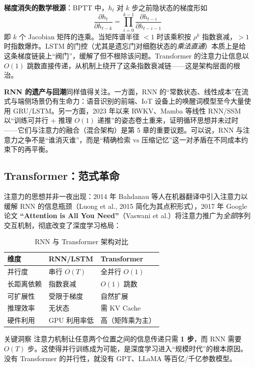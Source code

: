 \documentclass[12pt,a4paper]{article}
\begin{document}
\textbf{梯度消失的数学根源}：BPTT 中，$h_t$ 对 $k$ 步之前隐状态的梯度形如
\[
\frac{\partial h_t}{\partial h_{t-k}} = \prod_{i=0}^{k-1} \frac{\partial h_{t-i}}{\partial h_{t-i-1}}
\]
即 $k$ 个 Jacobian 矩阵的连乘。当矩阵谱半径 $<1$ 时该乘积按 $\rho^k$ 指数衰减，$>1$ 时指数爆炸。LSTM 的门控（尤其是遗忘门对细胞状态的\emph{乘法直通}）本质上是给这条梯度链装上“阀门”，缓解了但不根除该问题。Transformer 的注意力让信息以 $O(1)$ 跳数直接传递，从机制上绕开了这条指数衰减链——这是架构层面的根治。

\textbf{RNN 的遗产与回潮}同样值得关注。一方面，RNN 的“常数状态、线性成本”在流式与端侧场景仍有生命力：语音识别的前端、IoT 设备上的唤醒词模型至今大量使用 GRU/LSTM。另一方面，2023 年以来 RWKV、Mamba 等线性 RNN/SSM 以“训练可并行 + 推理 $O(1)$ 递推”的姿态卷土重来，证明循环思想并未过时——它们与注意力的融合（混合架构）是第 5 章的重要议题。可以说，RNN 与注意力之争不是“谁消灭谁”，而是“精确检索 vs 压缩记忆”这一对矛盾在不同成本约束下的再平衡。

\subsection{Transformer：范式革命}
注意力的思想并非一夜出现：2014 年 Bahdanau 等人在机器翻译中引入注意力以缓解 RNN 的信息瓶颈（Luong et al., 2015 简化为其点积形式），2017 年 Google 论文 \textbf{“Attention is All You Need”}（Vaswani et al.）将注意力推广为\emph{全部}序列交互机制，彻底改变了深度学习格局：

\begin{table}[htbp]
\centering
\small
\begin{tabular}{@{}lll@{}}
\toprule
\textbf{维度} & \textbf{RNN/LSTM} & \textbf{Transformer}\\
\midrule
并行度 & 串行 $O(T)$ & 全并行 $O(1)$\\
长距离依赖 & 指数衰减 & $O(1)$ 跳数\\
可扩展性 & 受限于梯度 & 自然扩展\\
推理效率 & 无状态 & 需 KV Cache\\
硬件利用 & GPU 利用率低 & 高（矩阵乘为主）\\
\bottomrule
\end{tabular}
\caption{RNN 与 Transformer 架构对比}
\end{table}

\begin{keybox}{关键洞察}
注意力机制让任意两个位置之间的信息传递只需 \textbf{1 步}，而 RNN 需要 $O(T)$ 步。这使得并行训练成为可能，是深度学习进入“规模时代”的根本原因。没有 Transformer 的并行性，就没有 GPT、LLaMA 等百亿/千亿参数模型。
\end{keybox}
\end{document}
